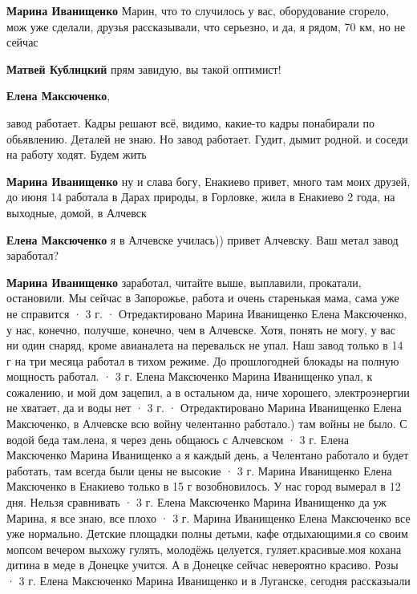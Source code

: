 \begin{itemize}
\begin{itemize}
\textbf{Марина Иванищенко} Марин, что то случилось у вас, оборудование сгорело, мож уже сделали, друзья рассказывали, что серьезно, и да, я рядом, 70 км, но не сейчас

\textbf{Матвей Кублицкий} прям завидую, вы такой оптимист!

\textbf{Елена Максюченко}, 

завод работает. Кадры решают всё, видимо, какие-то кадры понабирали по
обьявлению. Деталей не знаю. Но завод работает. Гудит, дымит родной. и соседи на
работу ходят. Будем жить

\textbf{Марина Иванищенко} ну и слава богу, Енакиево привет, много там моих друзей, до июня 14 работала в Дарах природы, в Горловке, жила в Енакиево 2 года, на выходные, домой, в Алчевск

\textbf{Елена Максюченко} я в Алчевске училась)) привет Алчевску. Ваш метал завод заработал?

\textbf{Марина Иванищенко} заработал, читайте выше, выплавили, прокатали, остановили. Мы сейчас в Запорожье, работа и очень старенькая мама, сама уже не справится
 · 3 г. · Отредактировано
Марина Иванищенко
Елена Максюченко, у нас, конечно, получше, конечно, чем в Алчевске. Хотя, понять не могу, у вас ни один снаряд, кроме авианалета на перевальск не упал. Наш завод только в 14 г на три месяца работал в тихом режиме. До прошлогодней блокады на полную мощность работал.
 · 3 г.
Елена Максюченко
Марина Иванищенко упал, к сожалению, и мой дом зацепил, а в остальном да, ниче хорошего, электроэнергии не хватает, да и воды нет
 · 3 г. · Отредактировано
Марина Иванищенко
Елена Максюченко, в Алчевске всю войну челентанно работало.) там войны не было. С водой беда там.лена, я через день общаюсь с Алчевском
 · 3 г.
Елена Максюченко
Марина Иванищенко а я каждый день, а Челентано работало и будет работать, там всегда были цены не высокие
 · 3 г.
Марина Иванищенко
Елена Максюченко в Енакиево только в 15 г возобновилось. У нас город вымерал в 12 дня. Нельзя сравнивать
 · 3 г.
Елена Максюченко
Марина Иванищенко да уж Марина, я все знаю, все плохо
 · 3 г.
Марина Иванищенко
Елена Максюченко все уже нормально. Детские площадки полны детьми, кафе отдыхающими.я со своим мопсом вечером выхожу гулять, молодёжь целуется, гуляет.красивые.моя кохана дитина в меде в Донецке учится. А в Донецке сейчас невероятно красиво. Розы
 · 3 г.
Елена Максюченко
Марина Иванищенко и в Луганске, сегодня рассказыали

\end{itemize} %

\end{itemize} %
